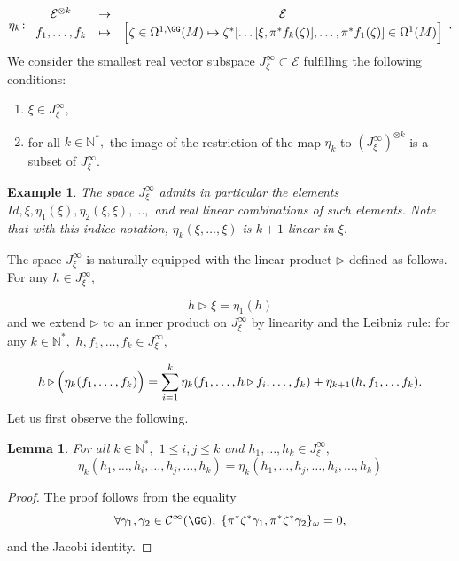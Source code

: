 \documentclass[a4paper,11pt]{article}
\newcommand{\func}[1]{\mathcal{C}^{\infty}(#1)}
\newtheorem{lemma}[theorem]{Lemma}
\newtheorem{ex}[theorem]{Example}
\begin{document}
\[
\eta_{k} \colon
\begin{array}{ccc}
\mathcal{E}^{\otimes k} & \to & \mathcal{E}\\
f_1, \ldots, f_k & \mapsto & \Bigl[ \zeta \in \Omega^{1, \GG}(M) \mapsto  \zeta^*[\ldots [ \xi, \pi^* f_k (\zeta)], \ldots, \pi^* f_1(\zeta)] \in \Omega^1(M) \Bigr]
\end{array}.
\]
We consider the smallest real vector subspace $J_\xi^\infty \subset \mathcal{E}$ fulfilling the following conditions:

\begin{enumerate} 
\item $\xi \in J_\xi^\infty,$
\item for all $k \in \mathbb{N}^*,$ the image of the restriction of the map $\eta_{k}$ to $(J_\xi^\infty)^{\otimes k}$ is a subset of $J_\xi^\infty.$
\end{enumerate}

\begin{ex}
The space $J_\xi^\infty$ admits in particular the elements $Id, \xi, \eta_1(\xi), \eta_2(\xi, \xi), \ldots,$ and real linear combinations of such elements. Note that with this indice notation, $\eta_k(\xi, \ldots, \xi)$ is $k+1$-linear in $\xi.$
\end{ex}
The space $J_\xi^\infty$ is naturally equipped with the linear product $\triangleright$ defined as follows. For any $h \in J_\xi^\infty,$

\[
h\triangleright \xi = \eta_1(h)
\]
and we extend $\triangleright$ to an inner product on $J_\xi^\infty$ by linearity and the Leibniz rule: for any $k \in \mathbb{N}^*,$ $h, f_1, \ldots, f_k  \in J_\xi^\infty,$

\[
h\triangleright \Bigl(\eta_{k}(f_1, \ldots, f_{k}) \Bigr)=\sum\limits_{i=1}^k \eta_{k}(f_1, \ldots, h \triangleright f_i, \ldots, f_k) + \eta_{k+1}(h, f_1, \ldots f_k).
\]
Let us first observe the following.
\begin{lemma}\label{lemma:eta_k}
For all $k \in \mathbb{N}^*,$ $1 \leq i,j \leq k$ and $h_1, \ldots, h_k \in J_\xi^\infty,$
\[
\eta_k(h_1, \ldots, h_i, \ldots, h_j, \ldots, h_k) = \eta_k(h_1, \ldots, h_j, \ldots, h_i, \ldots, h_k)
\]
\end{lemma}

\begin{proof}
The proof follows from the equality
\[
\forall \gamma_1, \gamma_2 \in \func{\GG}, \;  \{\pi^*\zeta^*\gamma_1,\pi^*\zeta^*\gamma_2\}_{\omega}=0,
\]
and the Jacobi identity.
\end{proof}
\end{document}
